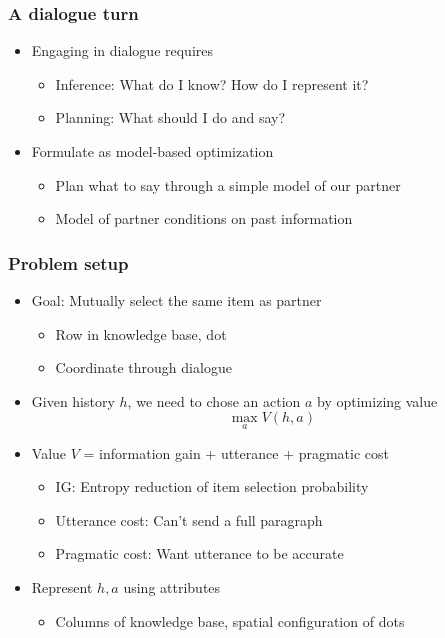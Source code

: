 \documentclass{beamer}
\begin{document}
\begin{frame}
\frametitle{A dialogue turn}
\begin{itemize}
\item Engaging in dialogue requires
    \begin{itemize}
    \item Inference: What do I know? How do I represent it?
    \item Planning: What should I do and say?
    \end{itemize}
\item Formulate as model-based optimization
    \begin{itemize}
    \item Plan what to say through a simple model of our partner
    \item Model of partner conditions on past information
    \end{itemize}
\end{itemize}
\end{frame}

\begin{frame}
\frametitle{Problem setup}
\begin{itemize}
\item Goal: Mutually select the same item as partner
    \begin{itemize}
    \item Row in knowledge base, dot
    \item Coordinate through dialogue
    \end{itemize}
\item Given history $h$,
we need to chose an action $a$ by optimizing value
\begin{equation*}
\max_a V(h, a)
\end{equation*}
\item Value $V$ = information gain + utterance + pragmatic cost
    \begin{itemize}
    \item IG: Entropy reduction of item selection probability
    \item Utterance cost: Can't send a full paragraph
    \item Pragmatic cost: Want utterance to be accurate
    \end{itemize}
\item Represent $h,a$ using attributes
    \begin{itemize}
    \item Columns of knowledge base, spatial configuration of dots
    \end{itemize}
\end{itemize}
\end{frame}
\end{document}
